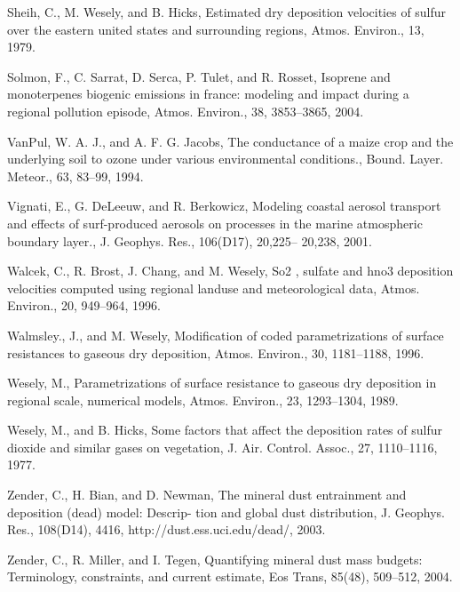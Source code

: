 \begin{description}
Sheih, C., M. Wesely, and B. Hicks, Estimated dry deposition velocities of sulfur over the eastern united
  states and surrounding regions, Atmos. Environ., 13, 1979.
\item
Solmon, F., C. Sarrat, D. Serca, P. Tulet, and R. Rosset, Isoprene and monoterpenes biogenic emissions in
  france: modeling and impact during a regional pollution episode, Atmos. Environ., 38, 3853–3865, 2004.
\item
VanPul, W. A. J., and A. F. G. Jacobs, The conductance of a maize crop and the underlying soil to ozone
  under various environmental conditions., Bound. Layer. Meteor., 63, 83–99, 1994.
\item
Vignati, E., G. DeLeeuw, and R. Berkowicz, Modeling coastal aerosol transport and effects of surf-produced
  aerosols on processes in the marine atmospheric boundary layer., J. Geophys. Res., 106(D17), 20,225–
  20,238, 2001.
\item
Walcek, C., R. Brost, J. Chang, and M. Wesely, So2 , sulfate and hno3 deposition velocities computed using
  regional landuse and meteorological data, Atmos. Environ., 20, 949–964, 1996.
\item
Walmsley., J., and M. Wesely, Modification of coded parametrizations of surface resistances to gaseous dry
  deposition, Atmos. Environ., 30, 1181–1188, 1996.
\item
Wesely, M., Parametrizations of surface resistance to gaseous dry deposition in regional scale, numerical
  models, Atmos. Environ., 23, 1293–1304, 1989.
\item
Wesely, M., and B. Hicks, Some factors that affect the deposition rates of sulfur dioxide and similar gases
  on vegetation, J. Air. Control. Assoc., 27, 1110–1116, 1977.
\item
Zender, C., H. Bian, and D. Newman, The mineral dust entrainment and deposition (dead) model: Descrip-
  tion and global dust distribution, J. Geophys. Res., 108(D14), 4416, http://dust.ess.uci.edu/dead/, 2003.
\item
Zender, C., R. Miller, and I. Tegen, Quantifying mineral dust mass budgets: Terminology, constraints, and
  current estimate, Eos Trans, 85(48), 509–512, 2004.

\end{description}


